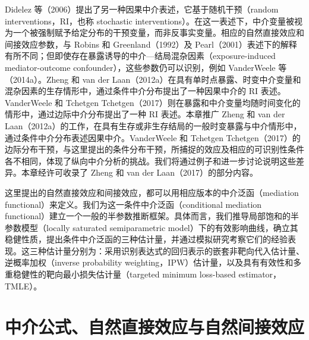 Didelez 等（2006）提出了另一种因果中介表述，它基于随机干预（random interventions，RI，也称 stochastic interventions）。在这一表述下，中介变量被视为一个被强制赋予给定分布的干预变量，而非反事实变量。相应的自然直接效应和间接效应参数，与 Robins 和 Greenland（1992）及 Pearl（2001）表述下的解释有所不同；但即使存在暴露诱导的中介—结局混杂因素（exposure-induced mediator-outcome confounder），这些参数仍可以识别，例如 VanderWeele 等（2014a）。Zheng 和 van der Laan（2012a）在具有单时点暴露、时变中介变量和混杂因素的生存情形中，通过条件中介分布提出了一种因果中介的 RI 表述。VanderWeele 和 Tchetgen Tchetgen（2017）则在暴露和中介变量均随时间变化的情形中，通过边际中介分布提出了一种 RI 表述。本章推广 Zheng 和 van der Laan（2012a）的工作，在具有生存或非生存结局的一般时变暴露与中介情形中，通过条件中介分布表述因果中介。VanderWeele 和 Tchetgen Tchetgen（2017）的边际分布干预，与这里提出的条件分布干预，所捕捉的效应及相应的可识别性条件各不相同，体现了纵向中介分析的挑战。我们将通过例子和进一步讨论说明这些差异。本章经许可收录了 Zheng 和 van der Laan（2017）的部分内容。

\begin{sourcebox}
这里提出的自然直接效应和间接效应，都可以用相应版本的中介泛函（mediation functional）来定义。我们为这一条件中介泛函（conditional mediation functional）建立一个一般的半参数推断框架。具体而言，我们推导局部饱和的半参数模型（locally saturated semiparametric model）下的有效影响曲线，确立其稳健性质，提出条件中介泛函的三种估计量，并通过模拟研究考察它们的经验表现。这三种估计量分别为：采用识别表达式的回归表示的嵌套非靶向代入估计量、逆概率加权（inverse probability weighting，IPW）估计量，以及具有有效性和多重稳健性的靶向最小损失估计量（targeted minimum loss-based estimator，TMLE）。
\end{sourcebox}

\section{中介公式、自然直接效应与自然间接效应}

